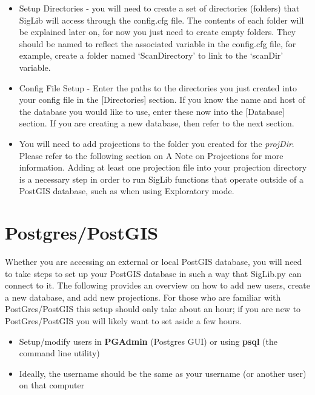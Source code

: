 \documentclass[letterpaper,10pt,openany,oneside]{sphinxmanual}
\begin{document}
\begin{itemize}
\item {} 
Setup Directories - you will need to create a set of directories
(folders) that SigLib will access through the config.cfg file. The
contents of each folder will be explained later on, for now you just
need to create empty folders. They should be named to reflect the
associated variable in the config.cfg file, for example, create a
folder named `ScanDirectory' to link to the `scanDir' variable.

\item {} 
Config File Setup - Enter the paths to the directories you just
created into your config file in the {[}Directories{]} section. If you
know the name and host of the database you would like to use, enter
these now into the {[}Database{]} section. If you are creating a new
database, then refer to the next section.

\item {} 
You will need to add projections to the folder you created for the
\emph{projDir}. Please refer to the following section on A Note on
Projections for more information. Adding at least one projection file
into your projection directory is a necessary step in order to run
SigLib functions that operate outside of a PostGIS database, such as
when using Exploratory mode.

\end{itemize}


\section{Postgres/PostGIS}
\label{wiki:postgres-postgis}
Whether you are accessing an external or local PostGIS database, you
will need to take steps to set up your PostGIS database in such a way
that SigLib.py can connect to it. The following provides an overview on
how to add new users, create a new database, and add new projections.
For those who are familiar with PostGres/PostGIS this setup should only
take about an hour; if you are new to PostGres/PostGIS you will likely
want to set aside a few hours.
\begin{itemize}
\item {} 
Setup/modify users in \textbf{PGAdmin} (Postgres GUI) or using \textbf{psql}
(the command line utility)

\item {} 
Ideally, the username should be the same as your username (or another
user) on that computer

\end{itemize}
\end{document}
